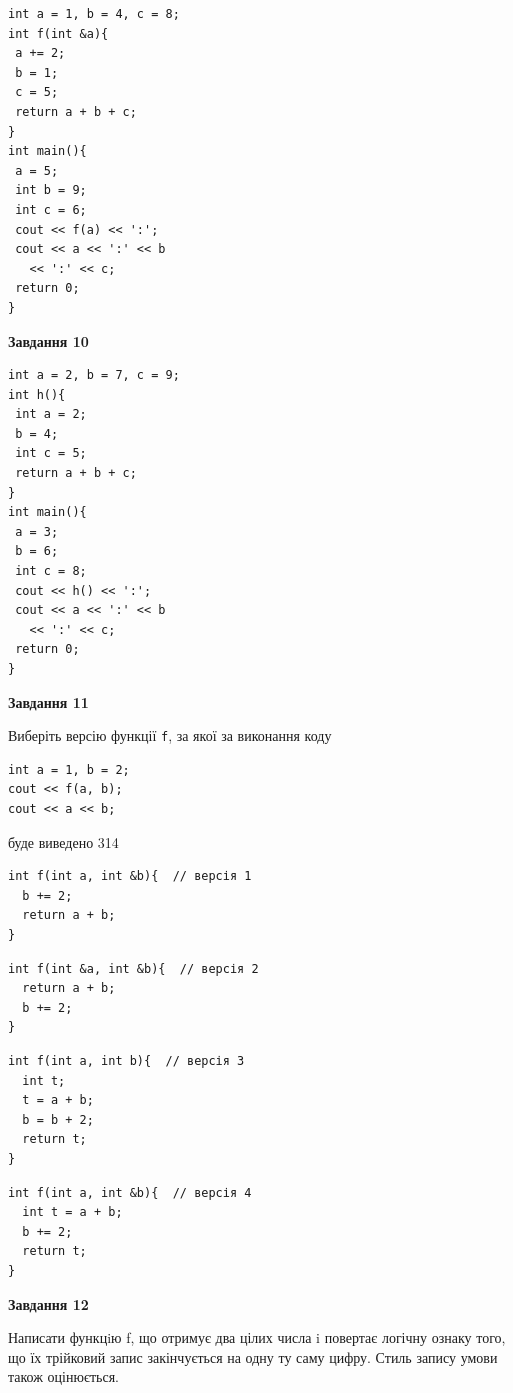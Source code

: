 \documentclass[12pt, ukrainian]{article}
\def\code#1{\Verb!#1!}
\begin{document}
{\begin {large}
\begin{minipage}[t]{7.0cm}
\begin{verbatim}
int a = 1, b = 4, c = 8;
int f(int &a){
 a += 2;
 b = 1;
 c = 5;
 return a + b + c;
}
int main(){
 a = 5;
 int b = 9;
 int c = 6;
 cout << f(a) << ':';
 cout << a << ':' << b 
   << ':' << c;
 return 0;
}
\end{verbatim}



\begin{center}
\textbf{Завдання 10}
\end{center}
\vspace{-8mm}

\begin{verbatim}
int a = 2, b = 7, c = 9;
int h(){
 int a = 2;
 b = 4;
 int c = 5;
 return a + b + c;
}
int main(){
 a = 3;
 b = 6;
 int c = 8;
 cout << h() << ':';
 cout << a << ':' << b 
   << ':' << c;
 return 0;
}
\end{verbatim}

\end{minipage}
\vline \hspace{1mm}
\begin{minipage}[t]{11.0cm}

\begin{center}
\textbf{Завдання 11}
\end{center}
Виберіть версію функції \code{f}, за якої за виконання коду
\begin{verbatim}
int a = 1, b = 2;
cout << f(a, b);
cout << a << b;
\end{verbatim}

буде виведено 314

\begin{verbatim}
int f(int a, int &b){  // версія 1
  b += 2;
  return a + b;
}
\end{verbatim}

\vspace{-8mm}\begin{verbatim}
int f(int &a, int &b){  // версія 2
  return a + b;
  b += 2;
}
\end{verbatim}

\vspace{-8mm}\begin{verbatim}
int f(int a, int b){  // версія 3
  int t;
  t = a + b;
  b = b + 2;
  return t;
}
\end{verbatim}

\vspace{-8mm}\begin{verbatim}
int f(int a, int &b){  // версія 4
  int t = a + b;
  b += 2;
  return t;
}
\end{verbatim}



\begin{center}
\textbf{Завдання 12}
\end{center}

Написати функцiю f, що отримує два цілих числа i повертає логічну ознаку того, що їх трійковий запис закінчується на одну ту саму цифру. Стиль запису умови також оцінюється.\par

\end{minipage}

\end {large}}
\end{document}
